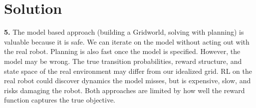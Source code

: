 \documentclass[submit]{../harvardml}
\newenvironment{solution}
  {\color{blue}\section*{Solution}}
{}
\begin{document}
\begin{solution}
\textbf{5.} The model based approach (building a Gridworld, solving with planning) is valuable because it is safe. We can iterate on the model without acting out with the real robot. Planning is also fast once the model is specified. However, the model may be wrong. The true transition probabilities, reward structure, and state space of the real environment may differ from our idealized grid. RL on the real robot could discover dynamics the model misses, but is expensive, slow, and risks damaging the robot. Both approaches are limited by how well the reward function captures the true objective.

\end{solution}



\newpage
\end{document}
